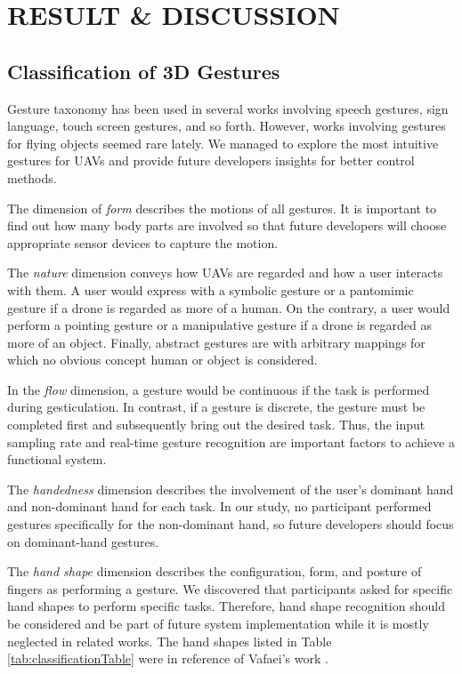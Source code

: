 \documentclass{sigchi}
\begin{document}
\section{RESULT \& DISCUSSION}

\subsection{Classification of 3D Gestures}
Gesture taxonomy has been used in several works involving speech gestures, sign language, touch screen gestures, and so forth. However, works involving gestures for flying objects seemed rare lately. We managed to explore the most intuitive gestures for UAVs and provide future developers insights for better control methods.

The dimension of {\it form} describes the motions of all gestures. It is important to find out how many body parts are involved so that future developers will choose appropriate sensor devices to capture the motion.

The {\it nature} dimension conveys how UAVs are regarded and how a user interacts with them. A user would express with a symbolic gesture or a pantomimic gesture if a drone is regarded as more of a human. On the contrary, a user would perform a pointing gesture or a manipulative gesture if a drone is regarded as more of an object. Finally, abstract gestures are with arbitrary mappings for which no obvious concept human or object is considered.

In the {\it flow} dimension, a gesture would be continuous if the task is performed during gesticulation. In contrast, if a gesture is discrete, the gesture must be completed first and subsequently bring out the desired task. Thus, the input sampling rate and real-time gesture recognition are important factors to achieve a functional system.

The {\it handedness} dimension describes the involvement of the user's dominant hand and non-dominant hand for each task. In our study, no participant performed gestures specifically for the non-dominant hand, so future developers should focus on dominant-hand gestures.

The {\it hand shape} dimension describes the configuration, form, and posture of fingers as performing a gesture. We discovered that participants asked for specific hand shapes to perform specific tasks. Therefore, hand shape recognition should be considered and be part of future system implementation while it is mostly neglected in related works. The hand shapes listed in Table \ref{tab:classificationTable} were in reference of Vafaei's work \cite{Vafaei:2013}.
\end{document}
